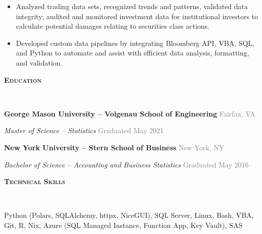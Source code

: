 \documentclass[12pt]{article}
\begin{document}
\begin{small}
\begin{itemize}[leftmargin=0.5cm]
    \item Analyzed trading data sets, recognized trends and patterns, validated data integrity; audited and monitored investment data for institutional investors to calculate potential damages relating to securities class actions.
      
    \item Developed custom data pipelines by integrating Bloomberg API, VBA, SQL, and Python to automate and assist with efficient data analysis, formatting, and validation.
      
  \end{itemize}
  \vspace{-2mm}
  
\end{small}
\vspace{-2mm}




\hrulefill

\begin{large}
	\textsc{\textbf{Education}}
	\vspace{-3mm}
\end{large}

\textcolor{lightgray}{\hrulefill}\\

\begin{small}
	
	\textbf{George Mason University -- Volgenau School of Engineering} \hfill
	\textcolor{gray}{Fairfax, VA}

	\textit{Master of Science -- Statistics} \hfill
	\textcolor{gray}{Graduated May 2021}

	\vspace{1mm}
	
	\textbf{New York University -- Stern School of Business} \hfill
	\textcolor{gray}{New York, NY}

	\textit{Bachelor of Science -- Accounting and Business Statistics} \hfill
	\textcolor{gray}{Graduated May 2016}

	\vspace{1mm}
	
	\vspace{-2mm}
\end{small}



\hrulefill

\begin{large}
	\textsc{\textbf{Technical Skills}}
	\vspace{-3mm}
\end{large}

\textcolor{lightgray}{\hrulefill}\\

\begin{small}
	Python (Polars, SQLAlchemy, httpx, NiceGUI), SQL Server, Linux, Bash, VBA, Git, R, Nix, Azure (SQL Managed Instance, Function App, Key Vault), SAS
\end{small}
\end{document}
